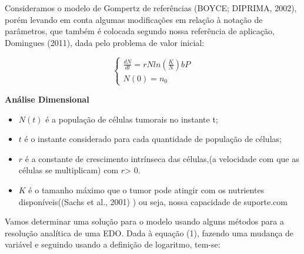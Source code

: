 Consideramos o modelo de Gompertz de referências (BOYCE; DIPRIMA, 2002), porém levando em conta algumas modificações em relação à notação de parâmetros, que também é colocada segundo nossa referência de aplicação, Domingues (2011), dada pelo problema de valor inicial:

   \begin{equation}
\begin{cases}
  \frac{dN}{dt} =rNln(\frac{K}{N}) 
   bP\\
   N(0)=n_0  
\end{cases}
\end{equation}

\textbf{Análise Dimensional}
\begin{itemize}
    \item $N(t)$ é a população de células tumorais no instante t;
    \item $t$ é o instante considerado para cada quantidade de população de células;
    \item $r$ é a constante de crescimento intrínseca das células,(a velocidade com  que as células se multiplicam) com $r$> 0.

    \item $K$ é o tamanho máximo que o tumor pode atingir com os nutrientes disponíveis((Sachs et al., 2001)
) ou seja, nossa capacidade de suporte.com 

\end{itemize}
  Vamos determinar uma solução para o modelo usando alguns métodos para a resolução analítica de uma EDO. Dada à equação (1), fazendo uma mudança de variável e seguindo usando a definição de logaritmo, tem-se:
  
